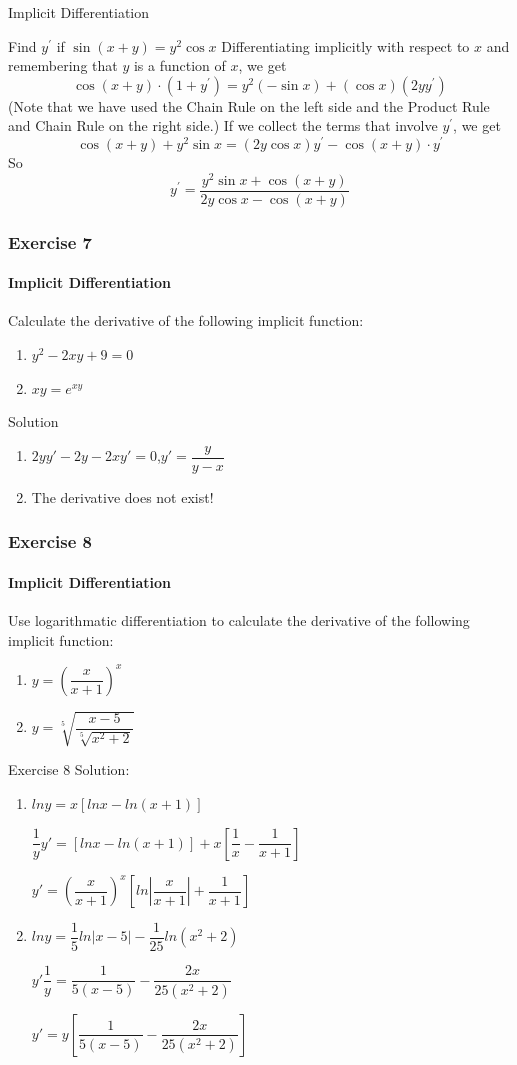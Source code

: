 \documentclass{beamer}
\begin{document}
\begin{frame}{Implicit Differentiation}
    \begin{block}{Find $y^{\prime}$ if $\sin (x+y)=y^{2} \cos x$}
    Differentiating implicitly with respect to $x$ and remembering that $y$ is a function of $x$, we get
$$
\cos (x+y) \cdot\left(1+y^{\prime}\right)=y^{2}(-\sin x)+(\cos x)\left(2 y y^{\prime}\right)
$$
(Note that we have used the Chain Rule on the left side and the Product Rule and Chain Rule on the right side.) If we collect the terms that involve $y^{\prime}$, we get
$$
\cos (x+y)+y^{2} \sin x=(2 y \cos x) y^{\prime}-\cos (x+y) \cdot y^{\prime}
$$
So
$$
y^{\prime}=\frac{y^{2} \sin x+\cos (x+y)}{2 y \cos x-\cos (x+y)}
$$
    \end{block}
\end{frame}
\begin{frame}
		\frametitle{Exercise 7}
		\framesubtitle{Implicit Differentiation}
			Calculate the derivative of the following implicit function:
				\begin{enumerate}
					\item $y^{2} - 2xy + 9 = 0$
					\item $xy = e^{xy}$
				\end{enumerate}
	\end{frame}
	\begin{frame}{Solution}
	    \begin{enumerate}
	        \item $2yy'-2y-2xy'=0$,$y'=\dfrac{y}{y-x}$
	        \item The derivative does not exist!
	    \end{enumerate}
	\end{frame}
\begin{frame}
		\frametitle{Exercise 8}
		\framesubtitle{Implicit Differentiation}
			Use \alert{logarithmatic differentiation} to calculate the derivative of the following implicit function:
				\begin{enumerate}
					\item $y = (\dfrac{x}{x + 1})^{x}$
					\item $y = \sqrt[5]{\dfrac{x - 5}{\sqrt[5]{x^{2} + 2}}}$
				\end{enumerate}
	\end{frame}
	
\begin{frame}{Exercise 8}
    Solution:
    \begin{enumerate}
        \item $lny = x[lnx - ln(x+1)]$
        
        $\dfrac{1}{y}y' = [lnx - ln(x+1)] + x[\dfrac{1}{x} - \dfrac{1}{x+1}]$
        
        $y' = (\dfrac{x}{x+1})^x [ln|\dfrac{x}{x+1}| + \dfrac{1}{x+1}]$
        \item $lny = \dfrac{1}{5}ln|x-5| - \dfrac{1}{25}ln(x^2 + 2)$
        
        $y'\dfrac{1}{y} = \dfrac{1}{5(x-5)} - \dfrac{2x}{25(x^2+2)}$
        
        $y' = y[\dfrac{1}{5(x-5)} - \dfrac{2x}{25(x^2+2)}]$
    \end{enumerate}
\end{frame}
\end{document}
